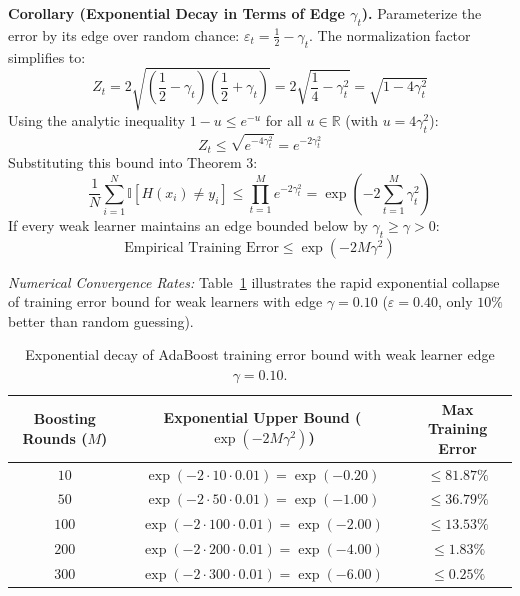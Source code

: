 \documentclass[11pt,a4paper]{article}
\newcommand{\R}{\mathbb{R}}
\begin{document}
\textbf{Corollary (Exponential Decay in Terms of Edge $\gamma_t$).}
Parameterize the error by its edge over random chance: $\varepsilon_t = \frac{1}{2} - \gamma_t$. The normalization factor simplifies to:
\begin{equation}
    Z_t = 2\sqrt{\left(\frac{1}{2} - \gamma_t\right)\left(\frac{1}{2} + \gamma_t\right)} = 2\sqrt{\frac{1}{4} - \gamma_t^2} = \sqrt{1 - 4\gamma_t^2}
\end{equation}
Using the analytic inequality $1 - u \le e^{-u}$ for all $u \in \R$ (with $u = 4\gamma_t^2$):
\begin{equation}
    Z_t \le \sqrt{e^{-4\gamma_t^2}} = e^{-2\gamma_t^2}
\end{equation}
Substituting this bound into Theorem 3:
\begin{equation}
    \frac{1}{N}\sum_{i=1}^N \mathbb{I}[H(x_i) \ne y_i] \le \prod_{t=1}^M e^{-2\gamma_t^2} = \exp\left( -2 \sum_{t=1}^M \gamma_t^2 \right)
\end{equation}
If every weak learner maintains an edge bounded below by $\gamma_t \ge \gamma > 0$:
\begin{equation}
    \text{Empirical Training Error} \le \exp\left( -2M\gamma^2 \right)
\end{equation}

\emph{Numerical Convergence Rates:} Table~\ref{tab:adaboost_convergence} illustrates the rapid exponential collapse of training error bound for weak learners with edge $\gamma = 0.10$ ($\varepsilon = 0.40$, only $10\%$ better than random guessing).

\begin{table}[!htbp]
\centering
\small
\begin{tabular}{@{}ccc@{}}
\toprule
\textbf{Boosting Rounds ($M$)} & \textbf{Exponential Upper Bound ($\exp(-2M\gamma^2)$)} & \textbf{Max Training Error} \\ \midrule
$10$                           & $\exp(-2 \cdot 10 \cdot 0.01) = \exp(-0.20)$           & $\le 81.87\%$               \\
$50$                           & $\exp(-2 \cdot 50 \cdot 0.01) = \exp(-1.00)$           & $\le 36.79\%$               \\
$100$                          & $\exp(-2 \cdot 100 \cdot 0.01) = \exp(-2.00)$          & $\le 13.53\%$               \\
$200$                          & $\exp(-2 \cdot 200 \cdot 0.01) = \exp(-4.00)$          & $\le 1.83\%$                \\
$300$                          & $\exp(-2 \cdot 300 \cdot 0.01) = \exp(-6.00)$          & $\le 0.25\%$                \\ \bottomrule
\end{tabular}
\caption{Exponential decay of AdaBoost training error bound with weak learner edge $\gamma = 0.10$.}
\label{tab:adaboost_convergence}
\end{table}
\end{document}
